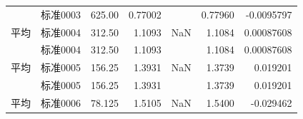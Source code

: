\documentclass[UTF8,10pt,a4paper,fontset=fandol]{ctexart}
\newcommand{\fieldvalue}[1]{#1}
\begin{document}
\begin{tabularx}{\textwidth}{l l r r r r r}
&
\fieldvalue{标准0003} &
\fieldvalue{625.00} &
\fieldvalue{0.77002} &
&
\fieldvalue{0.77960} &
\fieldvalue{-0.0095797}\\

平均 &
\fieldvalue{标准0004} &
\fieldvalue{312.50} &
\fieldvalue{1.1093} &
\fieldvalue{NaN} &
\fieldvalue{1.1084} &
\fieldvalue{0.00087608}\\

&
\fieldvalue{标准0004} &
\fieldvalue{312.50} &
\fieldvalue{1.1093} &
&
\fieldvalue{1.1084} &
\fieldvalue{0.00087608}\\

平均 &
\fieldvalue{标准0005} &
\fieldvalue{156.25} &
\fieldvalue{1.3931} &
\fieldvalue{NaN} &
\fieldvalue{1.3739} &
\fieldvalue{0.019201}\\

&
\fieldvalue{标准0005} &
\fieldvalue{156.25} &
\fieldvalue{1.3931} &
&
\fieldvalue{1.3739} &
\fieldvalue{0.019201}\\

平均 &
\fieldvalue{标准0006} &
\fieldvalue{78.125} &
\fieldvalue{1.5105} &
\fieldvalue{NaN} &
\fieldvalue{1.5400} &
\fieldvalue{-0.029462}\\


\end{tabularx}
\end{document}
